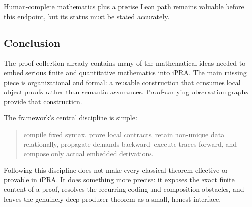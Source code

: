 Human-complete mathematics plus a precise Lean path remains valuable before
this endpoint, but its status must be stated accurately.

\subsection{Conclusion}

The proof collection already contains many of the mathematical ideas needed to
embed serious finite and quantitative mathematics into iPRA.  The main missing
piece is organizational and formal: a reusable construction that consumes
local object proofs rather than semantic assurances.  Proof-carrying
observation graphs provide that construction.

The framework's central discipline is simple:

\begin{quote}
compile fixed syntax, prove local contracts, retain non-unique data
relationally, propagate demands backward, execute traces forward, and compose
only actual embedded derivations.
\end{quote}

Following this discipline does not make every classical theorem effective or
provable in iPRA.  It does something more precise: it exposes the exact finite
content of a proof, resolves the recurring coding and composition obstacles,
and leaves the genuinely deep producer theorem as a small, honest interface.
